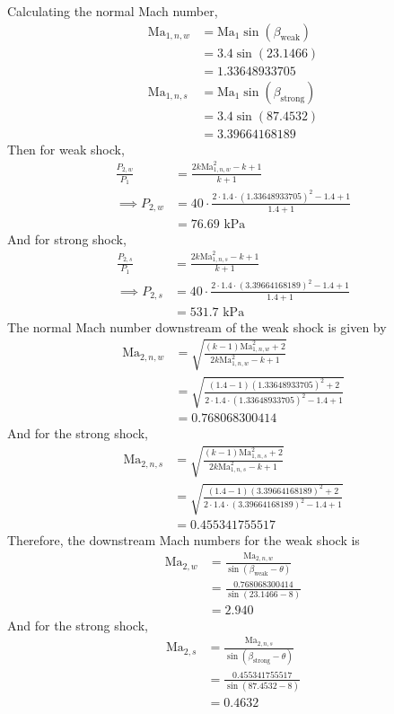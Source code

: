 Calculating the normal Mach number,
\begin{align*}
    \text{Ma}_{1, n, w} &= \text{Ma}_1 \sin (\beta_{\text{weak}}) \\
    &= 3.4 \sin (23.1466) \\
    &= 1.33648933705 \\
    \text{Ma}_{1, n, s} &= \text{Ma}_1 \sin (\beta_{\text{strong}}) \\
    &= 3.4 \sin (87.4532) \\
    &= 3.39664168189
\end{align*}
Then for weak shock, 
\begin{align*}
    \frac{P_{2, w}}{P_1} &= \frac{2 k \text{Ma}_{1, n, w}^2 - k + 1}{k + 1} \\
    \implies P_{2, w} &= 40 \cdot \frac{2 \cdot 1.4 \cdot (1.33648933705)^2 - 1.4 + 1}{1.4 + 1} \\
    &= \boxed{76.69 \text{ kPa}}
\end{align*}
And for strong shock,
\begin{align*}
    \frac{P_{2, s}}{P_1} &= \frac{2 k \text{Ma}_{1, n, s}^2 - k + 1}{k + 1} \\
    \implies P_{2, s} &= 40 \cdot \frac{2 \cdot 1.4 \cdot (3.39664168189)^2 - 1.4 + 1}{1.4 + 1} \\
    &= \boxed{531.7 \text{ kPa}}
\end{align*}
The normal Mach number downstream of the weak shock is given by
\begin{align*}
    \text{Ma}_{2, n, w} &= \sqrt{\frac{(k - 1) \text{Ma}_{1, n, w}^2 + 2}{2k \text{Ma}_{1, n, w}^2 - k + 1}} \\
    &= \sqrt{\frac{(1.4 - 1) (1.33648933705)^2 + 2}{2 \cdot 1.4 \cdot (1.33648933705)^2 - 1.4 + 1}} \\
    &= 0.768068300414
\end{align*}
And for the strong shock,
\begin{align*}
    \text{Ma}_{2, n, s} &= \sqrt{\frac{(k - 1) \text{Ma}_{1, n, s}^2 + 2}{2k \text{Ma}_{1, n, s}^2 - k + 1}} \\
    &= \sqrt{\frac{(1.4 - 1) (3.39664168189)^2 + 2}{2 \cdot 1.4 \cdot (3.39664168189)^2 - 1.4 + 1}} \\
    &= 0.455341755517
\end{align*}
Therefore, the downstream Mach numbers for the weak shock is 
\begin{align*}
    \text{Ma}_{2, w} &= \frac{\text{Ma}_{2, n, w}}{\sin (\beta_{\text{weak}} - \theta)} \\
    &= \frac{0.768068300414}{\sin (23.1466 - 8)} \\
    &= \boxed{2.940}
\end{align*}
And for the strong shock,
\begin{align*}
    \text{Ma}_{2, s} &= \frac{\text{Ma}_{2, n, s}}{\sin (\beta_{\text{strong}} - \theta)} \\
    &= \frac{0.455341755517}{\sin (87.4532 - 8)} \\
    &= \boxed{0.4632}
\end{align*}
